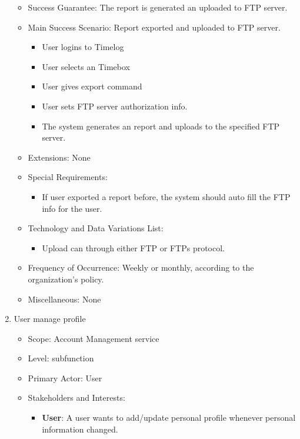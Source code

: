 \documentclass[12pt, a4paper]{article}
\begin{document}
\begin{CJK*}{UTF8}{bkai}
\begin{enumerate}
\begin{itemize}
\begin{itemize}
            \end{itemize}
          \item Success Guarantee: The report is generated an uploaded to FTP server.
          \item Main Success Scenario: Report exported and uploaded to FTP server.
            \begin{itemize}
              \item User logins to Timelog
              \item User selects an Timebox
              \item User gives export command
              \item User sets FTP server authorization info.
              \item The system generates an report and uploads to the specified FTP server.
            \end{itemize}
          \item Extensions: None
          \item Special Requirements:
            \begin{itemize}
              \item If user exported a report before, the system should auto fill the FTP info for the user.
            \end{itemize}
          \item Technology and Data Variations List:
            \begin{itemize}
              \item Upload can through either FTP or FTPs protocol.
            \end{itemize}
          \item Frequency of Occurrence: Weekly or monthly, according to the organization's policy.
          \item Miscellaneous: None
        \end{itemize}
      \item User manage profile
        \begin{itemize}
          \item Scope: Account Management service
          \item Level: subfunction
          \item Primary Actor: User
          \item Stakeholders and Interests:
            \begin{itemize}
              \item {\bf User}: A user wants to add/update personal profile whenever personal information changed.

\end{itemize}
\end{itemize}
\end{enumerate}
\end{CJK*}
\end{document}
